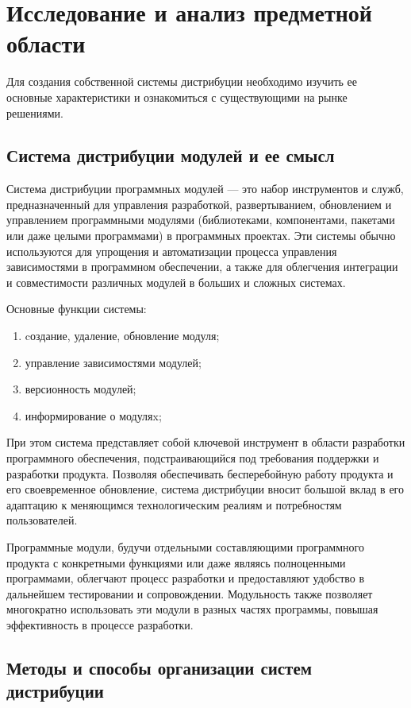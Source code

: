 \chapter{  Исследование и анализ предметной области}

Для создания собственной системы дистрибуции необходимо изучить ее основные характеристики и ознакомиться с существующими на рынке решениями.

\section{Система дистрибуции модулей и ее смысл}

Система дистрибуции программных модулей — это набор инструментов и служб, предназначенный для управления разработкой, развертыванием, обновлением и управлением программными модулями (библиотеками, компонентами, пакетами или даже целыми программами) в программных проектах. Эти системы обычно используются для упрощения и автоматизации процесса управления зависимостями в программном обеспечении, а также для облегчения интеграции и совместимости различных модулей в больших и сложных системах.

Основные функции системы:

\begin{enumerate}
\item cоздание, удаление, обновление модуля;
\item управление зависимостями модулей;
\item версионность модулей;
\item информирование о модуляx;
\end{enumerate}

При этом система представляет собой ключевой инструмент в области разработки программного обеспечения, подстраивающийся под требования поддержки и разработки продукта. Позволяя обеспечивать бесперебойную работу продукта и его своевременное обновление, система дистрибуции вносит большой вклад в его адаптацию к меняющимся технологическим реалиям и потребностям пользователей.

Программные модули, будучи отдельными составляющими программного продукта с конкретными функциями или даже являясь полноценными программами, облегчают процесс разработки и предоставляют удобство в дальнейшем тестировании и сопровождении. Модульность также позволяет многократно использовать эти модули в разных частях программы, повышая эффективность в процессе разработки.

\section{Методы и способы организации систем дистрибуции}

